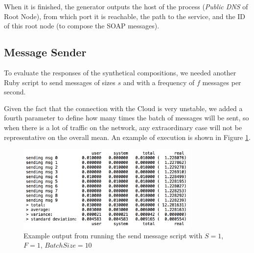 When it is finished, the generator outputs the host of the process (\emph{Public DNS} of Root Node), from which port it is reachable, the path to the service, and the ID of this root node (to compose the SOAP messages).

\subsection{Message Sender}

To evaluate the responses of the synthetical compositions, we needed another Ruby script to send messages of sizes $s$ and with a frequency of $f$ messages per second.

Given the fact that the connection with the Cloud is very unstable, we added a fourth parameter to define how many times the batch of messages will be sent, so when there is a lot of traffic on the network, any extraordinary case will not be representative on the overall mean. An example of execution is shown in Figure \ref{send-msg-output}.


\begin{figure}[htb]
	\centering
	\includegraphics[width=0.8\textwidth]{images/send-msg-output}
	\caption{Example output from running the send message script with $S = 1$, $F = 1$, $BatchSize = 10$}
	\label{send-msg-output}
\end{figure}
